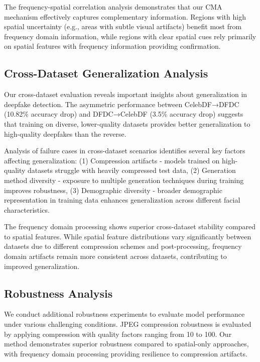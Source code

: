 \documentclass[letterpaper]{article} %
\begin{document}
The frequency-spatial correlation analysis demonstrates that our CMA mechanism effectively captures complementary information. Regions with high spatial uncertainty (e.g., areas with subtle visual artifacts) benefit most from frequency domain information, while regions with clear spatial cues rely primarily on spatial features with frequency information providing confirmation.

\subsection{Cross-Dataset Generalization Analysis}

Our cross-dataset evaluation reveals important insights about generalization in deepfake detection. The asymmetric performance between CelebDF→DFDC (10.82\% accuracy drop) and DFDC→CelebDF (3.5\% accuracy drop) suggests that training on diverse, lower-quality datasets provides better generalization to high-quality deepfakes than the reverse.

Analysis of failure cases in cross-dataset scenarios identifies several key factors affecting generalization: (1) Compression artifacts - models trained on high-quality datasets struggle with heavily compressed test data, (2) Generation method diversity - exposure to multiple generation techniques during training improves robustness, (3) Demographic diversity - broader demographic representation in training data enhances generalization across different facial characteristics.

The frequency domain processing shows superior cross-dataset stability compared to spatial features. While spatial feature distributions vary significantly between datasets due to different compression schemes and post-processing, frequency domain artifacts remain more consistent across datasets, contributing to improved generalization.

\subsection{Robustness Analysis}

We conduct additional robustness experiments to evaluate model performance under various challenging conditions. JPEG compression robustness is evaluated by applying compression with quality factors ranging from 10 to 100. Our method demonstrates superior robustness compared to spatial-only approaches, with frequency domain processing providing resilience to compression artifacts.
\end{document}

